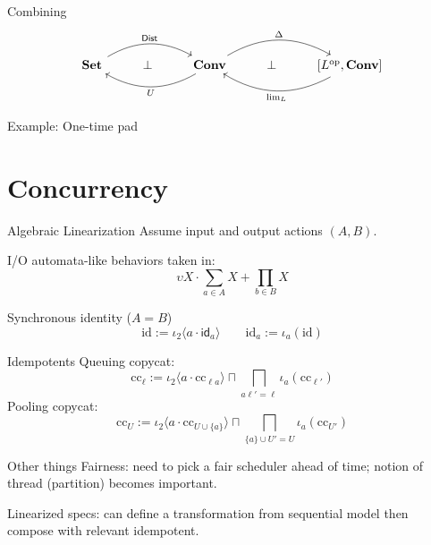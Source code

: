 \documentclass[aspectratio=1610,mathserif]{beamer}
\begin{document}
\begin{frame}[fragile]{Combining}
  \[
    \begin{tikzcd}
      \mathbf{Set} \ar[rr, bend left, "\mathsf{Dist}"] &
      \bot &
      \mathbf{Conv} \ar[ll, bend left, "U"]
                    \ar[rr, bend left, "\Delta"] &
      \bot &
      {[L^\mathrm{op}, \mathbf{Conv}]} \ar[ll, bend left, "{\mathrm{lim}_L}"]
    \end{tikzcd}
  \]
\end{frame}

\begin{frame}{Example: One-time pad}
\end{frame}


\section{Concurrency} %
\frame\sectionpage

\begin{frame}{Algebraic Linearization}
  Assume input and output actions $(A, B)$.

  I/O automata-like behaviors taken in:
  \[
    \upsilon X \cdot
    \sum_{a \in A} X +
    \prod_{b \in B} X
  \]

  Synchronous identity ($A = B$)
  \[
    \mathrm{id} := \iota_2 \langle a \cdot \mathsf{id}_a \rangle
    \qquad
    \mathrm{id}_a := \iota_a ( \mathrm{id} )
  \]
\end{frame}

\begin{frame}{Idempotents}
  Queuing copycat:
  \[
    \mathrm{cc}_\ell :=
      \iota_2 \langle a \cdot \mathrm{cc}_{\ell a} \rangle
      \sqcap
      \bigsqcap_{a \ell' = \ell} \iota_a(\mathrm{cc}_{\ell'})
  \]
  Pooling copycat:
  \[
    \mathrm{cc}_U :=
      \iota_2 \langle a \cdot \mathrm{cc}_{U \cup \{ a \}} \rangle
      \sqcap
      \bigsqcap_{ \{ a \} \cup U' = U} \iota_a(\mathrm{cc}_{U'})
  \] 
\end{frame}

\begin{frame}{Other things}
  Fairness:
  need to pick a fair scheduler ahead of time;
  notion of thread (partition) becomes important.

  \vspace{1em}
  Linearized specs:
  can define a transformation from sequential model
  then compose with relevant idempotent.
\end{frame}
\end{document}
